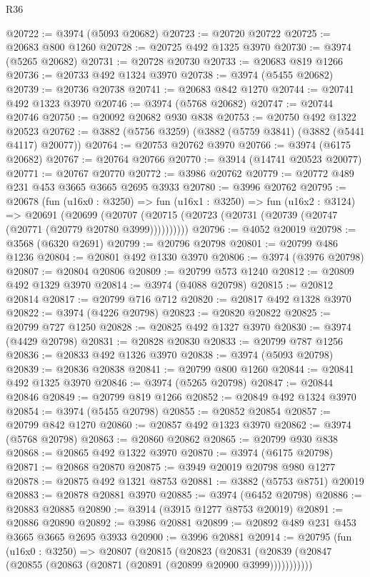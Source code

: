 \begin{lexlean}{R36}
\begin{coremodule}
@20722 := @3974 (@5093 @20682)
@20723 := @20720 @20722
@20725 := @20683 @800 @1260
@20728 := @20725 @492 @1325 @3970
@20730 := @3974 (@5265 @20682)
@20731 := @20728 @20730
@20733 := @20683 @819 @1266
@20736 := @20733 @492 @1324 @3970
@20738 := @3974 (@5455 @20682)
@20739 := @20736 @20738
@20741 := @20683 @842 @1270
@20744 := @20741 @492 @1323 @3970
@20746 := @3974 (@5768 @20682)
@20747 := @20744 @20746
@20750 := @20092 @20682 @930 @838
@20753 := @20750 @492 @1322 @20523
@20762 := @3882 (@5756 @3259) (@3882 (@5759 @3841) (@3882 (@5441 @4117) @20077))
@20764 := @20753 @20762 @3970
@20766 := @3974 (@6175 @20682)
@20767 := @20764 @20766
@20770 := @3914 (@14741 @20523 @20077)
@20771 := @20767 @20770
@20772 := @3986 @20762
@20779 := @20772 @489 @231 @453 @3665 @3665 @2695 @3933
@20780 := @3996 @20762
@20795 := @20678
    (fun (u16x0 : @3250) =>
    fun (u16x1 : @3250) =>
    fun (u16x2 : @3124) =>
    @20691
      (@20699 (@20707 (@20715 (@20723 (@20731 (@20739 (@20747 (@20771 (@20779 @20780 @3999))))))))))
@20796 := @4052 @20019
@20798 := @3568 (@6320 @2691)
@20799 := @20796 @20798
@20801 := @20799 @486 @1236
@20804 := @20801 @492 @1330 @3970
@20806 := @3974 (@3976 @20798)
@20807 := @20804 @20806
@20809 := @20799 @573 @1240
@20812 := @20809 @492 @1329 @3970
@20814 := @3974 (@4088 @20798)
@20815 := @20812 @20814
@20817 := @20799 @716 @712
@20820 := @20817 @492 @1328 @3970
@20822 := @3974 (@4226 @20798)
@20823 := @20820 @20822
@20825 := @20799 @727 @1250
@20828 := @20825 @492 @1327 @3970
@20830 := @3974 (@4429 @20798)
@20831 := @20828 @20830
@20833 := @20799 @787 @1256
@20836 := @20833 @492 @1326 @3970
@20838 := @3974 (@5093 @20798)
@20839 := @20836 @20838
@20841 := @20799 @800 @1260
@20844 := @20841 @492 @1325 @3970
@20846 := @3974 (@5265 @20798)
@20847 := @20844 @20846
@20849 := @20799 @819 @1266
@20852 := @20849 @492 @1324 @3970
@20854 := @3974 (@5455 @20798)
@20855 := @20852 @20854
@20857 := @20799 @842 @1270
@20860 := @20857 @492 @1323 @3970
@20862 := @3974 (@5768 @20798)
@20863 := @20860 @20862
@20865 := @20799 @930 @838
@20868 := @20865 @492 @1322 @3970
@20870 := @3974 (@6175 @20798)
@20871 := @20868 @20870
@20875 := @3949 @20019 @20798 @980 @1277
@20878 := @20875 @492 @1321 @8753
@20881 := @3882 (@5753 @8751) @20019
@20883 := @20878 @20881 @3970
@20885 := @3974 (@6452 @20798)
@20886 := @20883 @20885
@20890 := @3914 (@3915 @1277 @8753 @20019)
@20891 := @20886 @20890
@20892 := @3986 @20881
@20899 := @20892 @489 @231 @453 @3665 @3665 @2695 @3933
@20900 := @3996 @20881
@20914 := @20795
    (fun (u16x0 : @3250) =>
    @20807
      (@20815
        (@20823
          (@20831 (@20839 (@20847 (@20855 (@20863 (@20871 (@20891 (@20899 @20900 @3999)))))))))))

\end{coremodule}
\end{lexlean}
